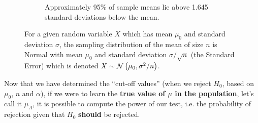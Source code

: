 \begin{figure}[h]
\begin{subfigure}[b]{0.45\linewidth}
    \label{fig:priori1b}
    \end{subfigure}\hfill
    \begin{subfigure}[b]{0.45\linewidth}
    \caption{Approximately 95\% of sample means lie above 1.645 standard deviations below the mean.}
    \label{fig:priori1c}
    \end{subfigure}
\caption{For a given random variable $X$ which has mean $\mu_0$ and standard deviation $\sigma$, the sampling distribution of the mean of size $n$ is Normal with mean $\mu_0$ and standard deviation $\sigma/\sqrt{n}$ (the Standard Error) which is denoted $\Bar{X} \sim \mathcal{N} \left( \mu_0, \sigma^2 /n \right)$.}
\label{fig:priori1}
\end{figure}
\FloatBarrier
Now that we have determined the ``cut-off values'' (when we reject $H_0$, based on $\mu_0$, $n$ and $\alpha$), if we were to learn the \textbf{true value of $\mu$ in the population}, let's call it $\mu_A$, it is possible to compute the power of our test, i.e. the probability of rejection given that $H_0$ \textbf{should} be rejected. 
